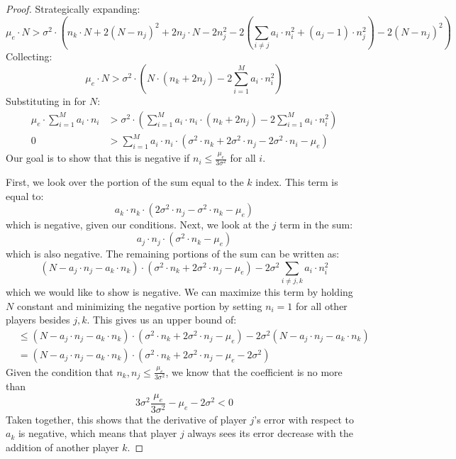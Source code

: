 \documentclass{article}
\newcommand{\p}[1]{\left( #1 \right)}
\newcommand{\cd}[0]{\cdot}
\newcommand{\nplayer}[0]{\ensuremath{M}}
\newcommand{\mue}[0]{\ensuremath{\mu_e}}
\newcommand{\var}[0]{\ensuremath{\sigma^2}}
\newcommand{\ndraw}[0]{\ensuremath{n}}
\newcommand{\total}[0]{\ensuremath{N}}
\begin{document}
\begin{proof}
Strategically expanding: 
$$\mue \cd \total > \var \cd \p{\ndraw_k \cd \total + 2 (\total -\ndraw_j)^2 + 2 \ndraw_j \cd \total - 2\ndraw_j^2 - 2 \p{\sum_{i\ne j} a_i \cd \ndraw_i^2 + (a_j-1) \cd \ndraw_j^2} - 2 (\total - \ndraw_j)^2}$$
Collecting: 
$$\mue \cd \total > \var \cd \p{\total \cd (\ndraw_k + 2 \ndraw_j) -2 \sum_{i=1}^{\nplayer} a_i \cd \ndraw_i^2}$$
Substituting in for $\total$:
\begin{align*}
\mue \cd \sum_{i=1}^{\nplayer} a_i \cd \ndraw_i&> \var \cd \p{\sum_{i=1}^{\nplayer} a_i \cd \ndraw_i \cd (\ndraw_k + 2 \ndraw_j) - 2 \sum_{i=1}^{\nplayer} a_i \cd \ndraw_i^2}\\
0 &> \sum_{i=1}^{\nplayer} a_i \cd \ndraw_i \cd (\var \cd \ndraw_k + 2 \var \cd \ndraw_j -2\var \cd  \ndraw_i - \mue)
\end{align*}
Our goal is to show that this is negative if $\ndraw_i \leq \frac{\mue}{3\var}$ for all $i$.

First, we look over the portion of the sum equal to the $k$ index. This term is equal to: 
$$a_k \cd \ndraw_k \cd (2\var \cd \ndraw_j - \var \cd \ndraw_k - \mue)$$
which is negative, given our conditions. Next, we look at the $j$ term in the sum: 
$$a_j \cd \ndraw_j \cd (\var \cd \ndraw_k - \mue)$$
which is also negative. The remaining portions of the sum can be written as: 
$$(\total - a_j \cd \ndraw_j - a_k \cd \ndraw_k) \cd (\var \cd \ndraw_k + 2 \var \cd \ndraw_j - \mue) - 2 \var \sum_{i \ne j, k} a_i \cd \ndraw_i^2$$
which we would like to show is negative. We can maximize this term by holding $\total$ constant and minimizing the negative portion by setting $\ndraw_i=1$ for all other players besides $j, k$. This gives us an upper bound of: 
\begin{align*}
&\leq (\total - a_j \cd \ndraw_j - a_k \cd \ndraw_k) \cd (\var \cd \ndraw_k + 2 \var \cd \ndraw_j - \mue) - 2 \var (\total - a_j \cd \ndraw_j - a_k \cd \ndraw_k)\\
&= (\total - a_j \cd \ndraw_j - a_k \cd \ndraw_k) \cd (\var \cd \ndraw_k + 2 \var \cd \ndraw_j - \mue - 2 \var)
\end{align*}
Given the condition that $\ndraw_k, \ndraw_j \leq \frac{\mue}{3\var}$, we know that the coefficient is no more than 
$$3 \var \frac{\mue}{3\var} - \mue - 2 \var < 0$$
Taken together, this shows that the derivative of player $j$'s error with respect to $a_k$ is negative, which means that player $j$ always sees its error decrease with the addition of another player $k$. 
\end{proof}
\end{document}
